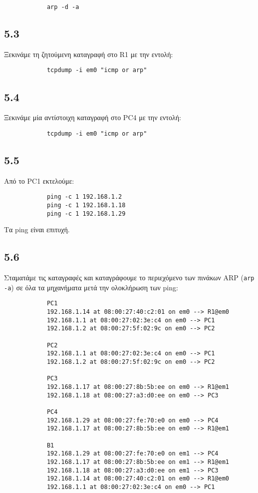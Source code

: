 \documentclass[a4paper, 12pt]{article}
\begin{document}
		\begin{verbatim}
			arp -d -a
		\end{verbatim}
		
	\subsection*{5.3}
		Ξεκινάμε τη ζητούμενη καταγραφή στο R1 με την εντολή: 
		
		\begin{verbatim}
			tcpdump -i em0 "icmp or arp"
		\end{verbatim}

	\subsection*{5.4}
		Ξεκινάμε μία αντίστοιχη καταγραφή στο PC4 με την εντολή:
		
		\begin{verbatim}
			tcpdump -i em0 "icmp or arp"
		\end{verbatim}

	\subsection*{5.5}
		Από το PC1 εκτελούμε:
		
		\begin{verbatim}
			ping -c 1 192.168.1.2
			ping -c 1 192.168.1.18
			ping -c 1 192.168.1.29
		\end{verbatim}
		
		Τα ping είναι επιτυχή.
		
	\subsection*{5.6}
		Σταματάμε τις καταγραφές και καταγράφουμε το περιεχόμενο των πινάκων ARP (\verb|arp -a|) σε όλα τα μηχανήματα μετά την ολοκλήρωση των ping:
		
		\begin{verbatim}
			PC1
			192.168.1.14 at 08:00:27:40:c2:01 on em0 --> R1@em0
			192.168.1.1 at 08:00:27:02:3e:c4 on em0 --> PC1
			192.168.1.2 at 08:00:27:5f:02:9c on em0 --> PC2
			
			PC2
			192.168.1.1 at 08:00:27:02:3e:c4 on em0 --> PC1
			192.168.1.2 at 08:00:27:5f:02:9c on em0 --> PC2
			
			PC3
			192.168.1.17 at 08:00:27:8b:5b:ee on em0 --> R1@em1
			192.168.1.18 at 08:00:27:a3:d0:ee on em0 --> PC3
			
			PC4
			192.168.1.29 at 08:00:27:fe:70:e0 on em0 --> PC4
			192.168.1.17 at 08:00:27:8b:5b:ee on em0 --> R1@em1
			
			B1
			192.168.1.29 at 08:00:27:fe:70:e0 on em1 --> PC4
			192.168.1.17 at 08:00:27:8b:5b:ee on em1 --> R1@em1
			192.168.1.18 at 08:00:27:a3:d0:ee on em1 --> PC3
			192.168.1.14 at 08:00:27:40:c2:01 on em0 --> R1@em0
			192.168.1.1 at 08:00:27:02:3e:c4 on em0 --> PC1
		\end{verbatim}
\end{document}
